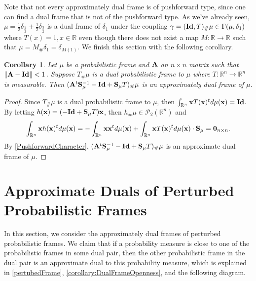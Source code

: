 \documentclass{amsart}
\numberwithin{equation}{section}
\newcommand{\bI}{{\bf Id}}
\theoremstyle{plain}
\newtheorem{corollary}[theorem]{Corollary}
\theoremstyle{remark}
\theoremstyle{definition}
\begin{document}
Note that not every approximately dual frame is of pushforward type, since one can find a dual frame that is not of the pushforward type.  As we've already seen, $\mu = \frac{1}{2}\delta_{\frac{1}{2}} + \frac{1}{2}\delta_{\frac{3}{2}}$ is a dual frame of $\delta_1$ under the coupling $\gamma = (\bI, T)_\#\mu \in \Gamma(\mu, \delta_1)$ where $T(x) = 1, x \in \mathbb{R}$ even though there does not exist a map $M: \mathbb{R} \rightarrow \mathbb{R}$ such that $\mu = M_\# \delta_1 = \delta_{M(1)}$. We finish this section with the following corollary. 

\begin{corollary}
        Let $\mu$ be a probabilistic frame and $\bf A$ an $n \times n$ matrix such that $\|{\bf A -Id} \| <1$.  Suppose $T_\# \mu$ is a dual probabilistic frame to $\mu$ where $T: \mathbb{R}^n \rightarrow \mathbb{R}^n$ is measurable. Then $({\bf A}^t{\bf S}_\mu^{-1}-{\bf Id}+{\bf S}_\mu T)_\# \mu$ is an approximately dual frame of $\mu$.
\end{corollary}
\begin{proof}
Since $T_\# \mu$ is a dual probabilistic frame to $\mu$, then $\int_{\mathbb{R}^n } {\bf x} T({\bf x})^t d\mu({\bf x}) = {\bf Id}$.
By letting $h({\bf x}) = (-{\bf Id}+{\bf S}_\mu T){\bf x}$, then $h_\#\mu \in \mathcal{P}_2(\mathbb{R}^n)$ and 
     \begin{equation*}
        \int_{\mathbb{R}^n } {\bf x} h({\bf x})^t d \mu({\bf x}) = - \int_{\mathbb{R}^n } {\bf x} {\bf x}^t d\mu({\bf x}) + \int_{\mathbb{R}^n } {\bf x} T({\bf x})^t d\mu({\bf x})\cdot {\bf S}_\mu = {\bf 0}_{n \times n}.
    \end{equation*}
   By \cref{PushforwardCharacter}, $({\bf A}^t{\bf S}_\mu^{-1}-{\bf Id}+{\bf S}_\mu T)_\# \mu$ is an approximate dual frame of $\mu$. 
\end{proof}


\section{Approximate Duals of Perturbed Probabilistic Frames }\label{peturbation}
In this section, we consider the approximately dual frames of perturbed probabilistic frames. We claim that if a probability measure is close to one of the probabilistic frames in some dual pair, then the other probabilistic frame in the dual pair is an approximate dual to this probability measure, which is explained in \cref{pertubedFrame}, \cref{corollary:DualFrameOpenness}, and the following diagram.
\begin{center}
\end{center}
\end{document}
